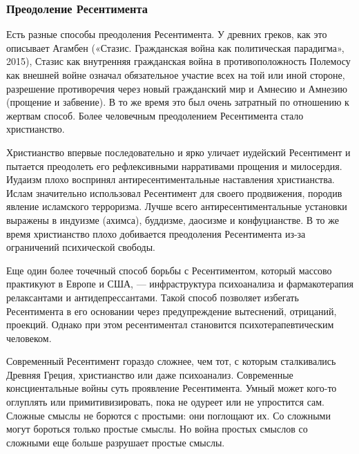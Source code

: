  
 
 
 
 

\subsubsection{Преодоление Ресентимента}
\label{sec:11_02_2022.stz.news.ua.hvylya.1.vse_zlo_ot_ressentimenta.5.preodolenie_ressentimenta}

Есть разные способы преодоления Ресентимента. У древних греков, как это
описывает Агамбен («Стазис. Гражданская война как политическая парадигма»,
2015), Стазис как внутренняя гражданская война в противоположность Полемосу как
внешней войне означал обязательное участие всех на той или иной стороне,
разрешение противоречия через новый гражданский мир и Амнесию и Амнезию
(прощение и забвение). В то же время это был очень затратный по отношению к
жертвам способ. Более человечным преодолением Ресентимента стало христианство.

Христианство впервые последовательно и ярко уличает иудейский Ресентимент и
пытается преодолеть его рефлексивными нарративами прощения и милосердия.
Иудаизм плохо воспринял антиресентиментальные наставления христианства. Ислам
значительно использовал Ресентимент для своего продвижения, породив явление
исламского терроризма. Лучше всего антиресентиментальные установки выражены в
индуизме (ахимса), буддизме, даосизме и конфуцианстве. В то же время
христианство плохо добивается преодоления Ресентимента из-за ограничений
психической свободы.

Еще один более точечный способ борьбы с Ресентиментом, который массово
практикуют в Европе и США, — инфраструктура психоанализа и фармакотерапия
релаксантами и антидепрессантами. Такой способ позволяет избегать Ресентимента
в его основании через предупреждение вытеснений, отрицаний, проекций. Однако
при этом ресентиментал становится психотерапевтическим человеком.

Современный Ресентимент гораздо сложнее, чем тот, с которым сталкивались
Древняя Греция, христианство или даже психоанализ. Современные консциентальные
войны суть проявление Ресентимента. Умный может кого-то оглуплять или
примитивизировать, пока не одуреет или не упростится сам. Сложные смыслы не
борются с простыми: они поглощают их. Со сложными могут бороться только простые
смыслы. Но война простых смыслов со сложными еще больше разрушает простые
смыслы.

